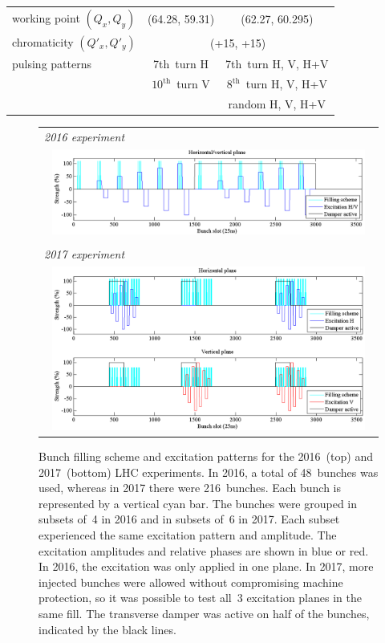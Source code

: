 \documentclass[%
 reprint,
 amsmath,amssymb,
 aps,
prstab,
longbibliography
]{revtex4-1}
\begin{document}
\begin{table}
\begin{ruledtabular}
\begin{tabular}{lcc}
      working point $(Q_x, Q_y)$ & (64.28, 59.31) & (62.27, 60.295) \\
      chromaticity $(Q'_x, Q'_y)$ & \multicolumn{2}{c}{(+15, +15)}\\ \hline
      pulsing patterns  & 7th~turn H
                                  &7th~turn H, V, H+V \\
                & $10^{\mathrm{th}}$~turn V & $8^{\mathrm{th}}$~turn
                                              H, V, H+V \\
                & &  random  H, V, H+V\\
    \end{tabular}
  \end{ruledtabular}
\end{table}

\begin{figure}
  \begin{tabular}{c}
    \multicolumn{1}{l}{\emph{2016 experiment}} \\
    \includegraphics[width=0.95\textwidth]{bunchfilling_2016.png} \\
    \\
    \multicolumn{1}{l}{\emph{2017 experiment}} \\
    \includegraphics[width=0.95\textwidth]{bunchfilling_2017.png}
  \end{tabular}
  \caption{Bunch filling scheme and excitation patterns for the
    2016~(top) and 2017~(bottom) LHC experiments. In 2016, a total of
    48~bunches was used, whereas in 2017 there were 216~bunches. Each
    bunch is represented by a vertical cyan bar. The bunches were
    grouped in subsets of~4 in 2016 and in subsets of~6 in 2017. Each
    subset experienced the same excitation pattern and amplitude. The
    excitation amplitudes and relative phases are shown in blue or
    red. In 2016, the excitation was only applied in one plane. In
    2017, more injected bunches were allowed without compromising
    machine protection, so it was possible to test all~3 excitation
    planes in the same fill. The transverse damper was active on half
    of the bunches, indicated by the black lines.}
  \label{fig:fill}
\end{figure}
\end{document}
